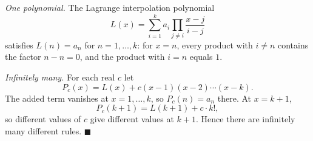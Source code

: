\emph{One polynomial.} The Lagrange interpolation polynomial
\[L(x)=\sum_{i=1}^{k}a_i\prod_{j\ne i}\dfrac{x-j}{i-j}\]
satisfies $L(n)=a_n$ for $n=1,\dots,k$: for $x=n$, every product with $i\ne n$ contains the factor $n-n=0$, and the product with $i=n$ equals $1$.

\emph{Infinitely many.} For each real $c$ let
\[P_c(x)=L(x)+c(x-1)(x-2)\cdots(x-k).\]
The added term vanishes at $x=1,\dots,k$, so $P_c(n)=a_n$ there. At $x=k+1$,
\[P_c(k+1)=L(k+1)+c\cdot k!,\]
so different values of $c$ give different values at $k+1$. Hence there are infinitely many different rules. $\blacksquare$
